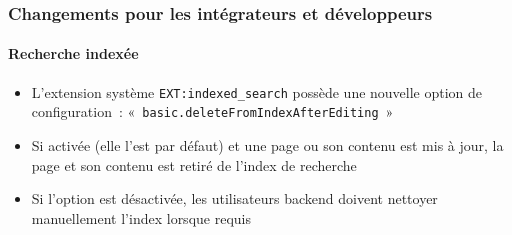 %

\begin{frame}[fragile]
	\frametitle{Changements pour les intégrateurs et développeurs}
	\framesubtitle{Recherche indexée}


	\begin{itemize}
		\item L'extension système \texttt{EXT:indexed\_search} possède
			une nouvelle option de configuration~:
			\small«~\texttt{basic.deleteFromIndexAfterEditing}~»\normalsize
		\item Si activée (elle l'est par défaut) et une page ou son contenu est mis à jour,
			la page et son contenu est retiré de l'index de recherche
		\item Si l'option est désactivée, les utilisateurs backend doivent nettoyer manuellement
			l'index lorsque requis
	\end{itemize}

\end{frame}

